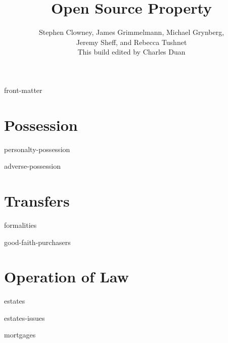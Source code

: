 \documentclass[12pt]{book}
\title{Open Source Property}
\author{Stephen Clowney, James Grimmelmann, Michael Grynberg,\\
Jeremy Sheff, and Rebecca Tushnet \\[12pt]
This build edited by Charles Duan}
\begin{document}
\sloppy
\raggedbottom
\frenchspacing
{}                                                
\parskip=0pt                                                  


\frontmatter

\maketitle

\tableofcontents

\module front-matter

\mainmatter

\part{Possession}

\module personalty-possession

\module adverse-possession


\part{Transfers}

\module formalities

\module good-faith-purchasers


\part{Operation of Law}

\module estates

\module estates-issues

\module mortgages
\end{document}

